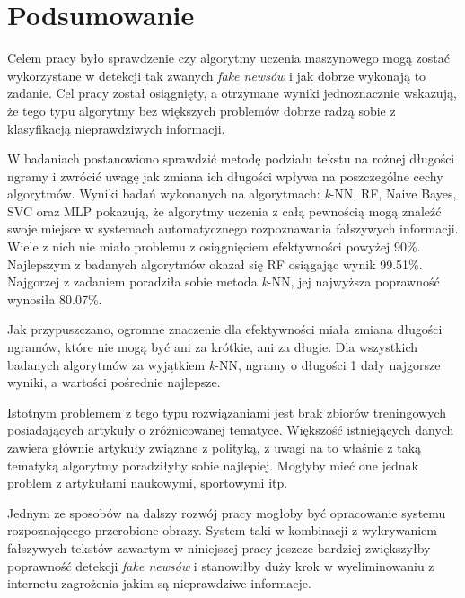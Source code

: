 \chapter{Podsumowanie}
Celem pracy było sprawdzenie czy algorytmy uczenia maszynowego mogą zostać wykorzystane
w detekcji tak zwanych \textit{fake newsów} i jak dobrze wykonają to zadanie. Cel pracy został osiągnięty,
a otrzymane wyniki jednoznacznie wskazują, że tego typu algorytmy bez większych problemów dobrze 
radzą sobie z klasyfikacją nieprawdziwych informacji.


W badaniach postanowiono sprawdzić metodę podziału tekstu na rożnej długości ngramy i zwrócić uwagę 
jak zmiana ich długości wpływa na poszczególne cechy algorytmów.
Wyniki badań wykonanych na algorytmach: \textit{k}-NN, RF, Naive Bayes,
SVC oraz MLP pokazują, że algorytmy uczenia z całą pewnością mogą znaleźć swoje miejsce w systemach
automatycznego rozpoznawania fałszywych informacji. Wiele z nich nie miało problemu z osiągnięciem 
efektywności powyżej 90\%. Najlepszym z badanych algorytmów okazał się RF osiągając
wynik 99.51\%. Najgorzej z zadaniem poradziła sobie metoda \textit{k}-NN, jej najwyższa 
poprawność wynosiła 80.07\%.

Jak przypuszczano, ogromne znaczenie dla efektywności
miała zmiana długości ngramów, które nie mogą być ani za krótkie, ani za długie.
Dla wszystkich badanych algorytmów za wyjątkiem \textit{k}-NN, ngramy o długości 1 dały najgorsze wyniki, a wartości
pośrednie najlepsze.

Istotnym problemem z tego typu rozwiązaniami jest brak zbiorów treningowych posiadających 
artykuły o zróżnicowanej tematyce. Większość istniejących danych zawiera głównie artykuły związane z 
polityką, z uwagi na to właśnie z taką tematyką algorytmy poradziłyby sobie najlepiej. Mogłyby mieć one jednak problem 
z artykułami naukowymi, sportowymi itp.

Jednym ze sposobów na dalszy rozwój pracy mogłoby być opracowanie systemu rozpoznającego 
przerobione obrazy. System taki w kombinacji z wykrywaniem fałszywych tekstów zawartym
w niniejszej pracy jeszcze bardziej zwiększyłby poprawność detekcji \textit{fake newsów} i stanowiłby 
duży krok w wyeliminowaniu z internetu zagrożenia jakim są nieprawdziwe informacje.